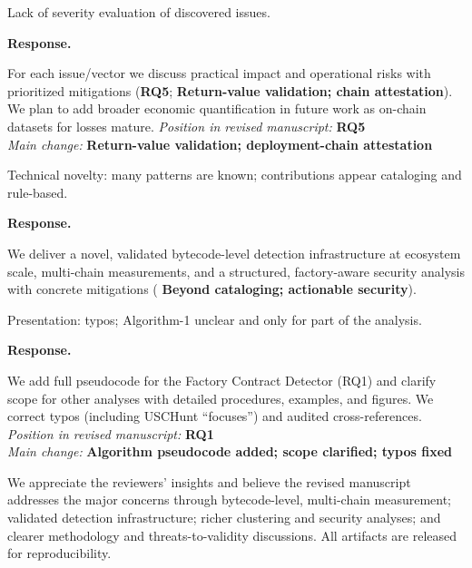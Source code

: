 \documentclass[acmsmall]{acmart}
\begin{document}
	\begin{tcolorbox}
		[commentbox,title=Reviewer \#4 -- Comment 3] Lack of severity evaluation of discovered issues.
	\end{tcolorbox}

	\noindent
	\textbf{Response.}

	For each issue/vector we discuss practical impact and operational risks with prioritized
	mitigations ({\textbf{RQ5}}; {\textbf{Return-value validation; chain attestation}}). We plan to
	add broader economic quantification in future work as on-chain datasets for losses mature. \textit{Position
	in revised manuscript:} {\color{red}\textbf{RQ5}}\\ \textit{Main change:}
	{\color{blue}\textbf{Return-value validation; deployment-chain attestation}}

	\begin{tcolorbox}
		[commentbox,title=Reviewer \#4 -- Comment 4] Technical novelty: many patterns are known; contributions
		appear cataloging and rule-based.
	\end{tcolorbox}

	\noindent
	\textbf{Response.}

	We deliver a novel, validated bytecode-level detection infrastructure at ecosystem scale, multi-chain
	measurements, and a structured, factory-aware security analysis with concrete mitigations (
	{\textbf{Beyond cataloging; actionable security}}).

	\begin{tcolorbox}
		[commentbox,title=Reviewer \#4 -- Comment 5] Presentation: typos; Algorithm-1 unclear and only
		for part of the analysis.
	\end{tcolorbox}

	\noindent
	\textbf{Response.}

	We add full pseudocode for the Factory Contract Detector (RQ1) and clarify scope for other
	analyses with detailed procedures, examples, and figures. We correct typos (including USCHunt
	“focuses”) and audited cross-references. \textit{Position in revised manuscript:} {\color{red}\textbf{RQ1}}\\
	\textit{Main change:} {\color{blue}\textbf{Algorithm pseudocode added; scope clarified; typos fixed}}

	\vspace{1em}
	\noindent
	We appreciate the reviewers’ insights and believe the revised manuscript addresses the major
	concerns through bytecode-level, multi-chain measurement; validated detection infrastructure; richer
	clustering and security analyses; and clearer methodology and threats-to-validity discussions. All
	artifacts are released for reproducibility.
\end{document}
